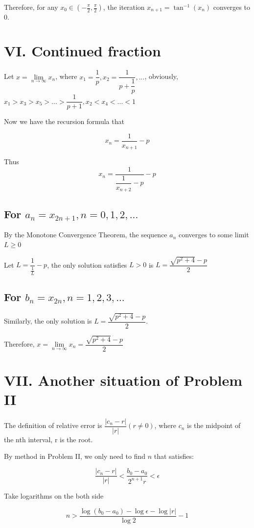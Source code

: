 \documentclass[a4paper]{article}
\begin{document}
Therefore, for any \(x_0 \in (-\frac{\pi}{2}, \frac{\pi}{2})\), the iteration \(x_{n+1} = \tan^{-1}(x_n)\) converges to 0.

\section*{VI. Continued fraction}

Let $x = \lim\limits_{n \rightarrow \infty} x_n$, where $x_1 = \dfrac1p, x_2 = \dfrac{1}{p+\dfrac1p}, ...$, obviously, $x_1 > x_3 > x_5 > ... > \dfrac1{p+1}, x_2 < x_4 < ... < 1$

Now we have the recursion formula that

$$x_{n} = \dfrac1{x_{n+1}}-p$$

Thus
$$x_n = \dfrac{1}{\dfrac{1}{x_{n+2}}-p}-p$$

\subsection*{For $a_n = x_{2n+1}, n = 0, 1, 2, ...$}

By the Monotone Convergence Theorem, the sequence $a_n$ converges to some limit \(L \geq 0\)

Let $L = \dfrac{1}{\frac{1}{L}}-p$, the only solution satisfies $L > 0$ is $L = \dfrac{\sqrt{p^2+4}-p}{2}$

\subsection*{For $b_n = x_{2n}, n = 1, 2, 3, ...$}

Similarly, the only solution is $L = \dfrac{\sqrt{p^2+4}-p}{2}$.

Therefore, $x = \lim\limits_{n \rightarrow \infty} x_n = \dfrac{\sqrt{p^2+4}-p}{2}$

\section*{VII. Another situation of Problem II}

The definition of relative error is $\dfrac{|c_n - r|}{|r|}(r \neq 0)$, where $c_n$ is the midpoint of the nth interval, r is the root.

By method in Problem II, we only need to find $n$ that satisfies:

$$\dfrac{|c_n - r|}{|r|} < \dfrac{b_0 - a_0}{2^{n+1}r} < \epsilon$$

Take logarithms on the both side

$$n > \dfrac{\log(b_0 - a_0) - \log\epsilon - \log|r|}{\log2} - 1$$
\end{document}
